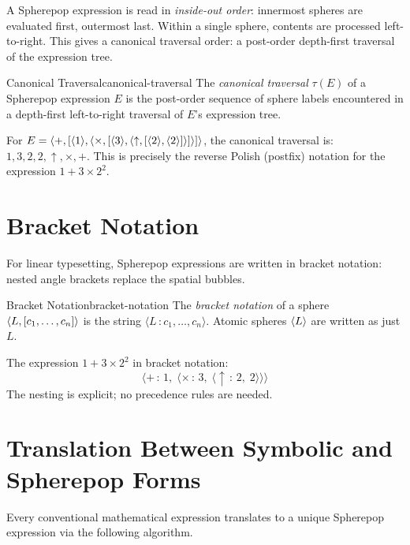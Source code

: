 A Spherepop expression is read in \emph{inside-out order}: innermost
spheres are evaluated first, outermost last. Within a single sphere,
contents are processed left-to-right. This gives a canonical traversal
order: a post-order depth-first traversal of the expression tree.

\begin{definition}{Canonical Traversal}{canonical-traversal}
  The \emph{canonical traversal} $\tau(E)$ of a Spherepop expression $E$
  is the post-order sequence of sphere labels encountered in a depth-first
  left-to-right traversal of $E$'s expression tree.
\end{definition}

\begin{example}
  For $E = \langle +, [\langle 1 \rangle, \langle \times, [\langle 3 \rangle,
  \langle \uparrow, [\langle 2 \rangle, \langle 2 \rangle] \rangle] \rangle] \rangle$, the canonical
  traversal is: $1, 3, 2, 2, \uparrow, \times, +$.
  This is precisely the reverse Polish (postfix) notation for the
  expression $1 + 3 \times 2^2$.
\end{example}

\section{Bracket Notation}

For linear typesetting, Spherepop expressions are written in bracket
notation: nested angle brackets replace the spatial bubbles.

\begin{definition}{Bracket Notation}{bracket-notation}
  The \emph{bracket notation} of a sphere $\langle L, [c_1,\ldots,c_n] \rangle$
  is the string $\langle L\, : c_1, \ldots, c_n\rangle$.
  Atomic spheres $\langle L \rangle$ are written as just $L$.
\end{definition}

\begin{example}
  The expression $1 + 3 \times 2^2$ in bracket notation:
  \[
    \langle {+} \,:\, 1,\; \langle{\times}\,:\,3,\;
    \langle{\uparrow}\,:\,2,\;2\rangle\rangle\rangle
  \]
  The nesting is explicit; no precedence rules are needed.
\end{example}

\section{Translation Between Symbolic and Spherepop Forms}

Every conventional mathematical expression translates to a unique
Spherepop expression via the following algorithm.

